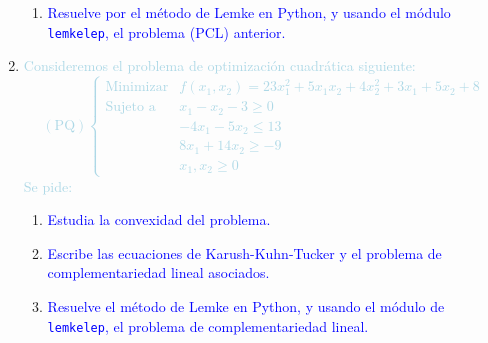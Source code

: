 \documentclass[12pt]{article}
\newcommand{\lb}[1]{\textcolor{lightblue}{#1}}
\newcommand{\db}[1]{\textcolor{blue}{#1}}
\begin{document}
\begin{enumerate}[label=\color{red}\arabic*.]
\begin{enumerate}[label=\color{red}\alph*)]
    	\item \db{Resuelve por el método de Lemke en Python, y usando el módulo \texttt{lemkelep}, el problema (PCL) anterior.}
    \end{enumerate}
    \item \lb{Consideremos el problema de optimización cuadrática siguiente: \[ (\mathrm{PQ})\begin{cases}
    \text{Minimizar} & f(x_1,x_2)=23x_1^2+5x_1x_2+4x_2^2+3x_1+5x_2+8\\
    \text{Sujeto a} & x_1-x_2-3\ge0\\
    & -4x_1-5x_2\le13\\
    &8x_1+14x_2\ge-9\\
    &x_1,x_2\ge0
    \end{cases} \]Se pide:}
    \begin{enumerate}[label=\color{red}\alph*)]
    	\item \db{Estudia la convexidad del problema.}
    	
    	\item \db{Escribe las ecuaciones de Karush-Kuhn-Tucker y el problema de complementariedad lineal asociados.}
    	
    	\item \db{Resuelve el método de Lemke en Python, y usando el módulo de \texttt{lemkelep}, el problema de complementariedad lineal.}
    \end{enumerate}
\end{enumerate}
\end{document}
